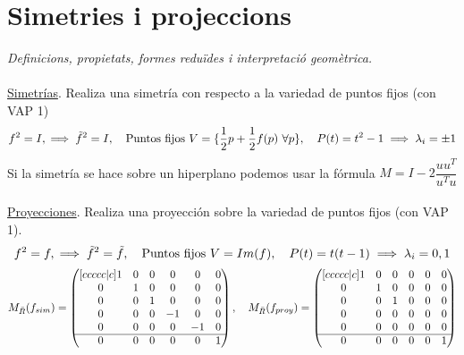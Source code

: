 \documentclass{article}
\newcommand{\h}{\hspace{1em}}
\renewcommand{\t}[1]{\text{#1}}
\begin{document}
\section{Simetries i projeccions} 
\textit{Definicions, propietats, formes reduïdes i interpretació
geomètrica.} \\
\\
\underline{Simetrías}. Realiza una simetría con respecto a la variedad de puntos fijos (con VAP 1)\\
\[f^2 = I, \implies \Tilde{f}^2 = I, \h \t{Puntos fijos } V = \{\frac{1}{2}p + \frac{1}{2} f(p) \ \forall p\}, \h P(t)= t^2-1 \implies \lambda_i = \pm 1\]
Si la simetría se hace sobre un hiperplano podemos usar la fórmula $M = I - 2\dfrac{uu^T}{u^Tu}$ \\
\\
\underline{Proyecciones}. Realiza una proyección sobre la variedad de puntos fijos (con VAP 1).
\[f^2 = f, \implies \Tilde{f}^2 = \Tilde{f}, \h \t{Puntos fijos } V = Im(f), \h P(t)= t(t-1) \implies \lambda_i = 0, 1\]
\[M_{\Bar{R}}(f_{sim}) = 
\begin{pmatrix}[ccccc|c]
    1 & 0 & 0 & 0 & 0 & 0 \\
    0 & 1 & 0 & 0 & 0 & 0 \\
    0 & 0 & 1 & 0 & 0 & 0 \\
    0 & 0 & 0 & -1 & 0 & 0 \\
    0 & 0 & 0 & 0 & -1 & 0 \\
    \hline
    0 & 0 & 0 & 0 & 0 & 1 \\
\end{pmatrix}, \h 
M_{\Bar{R}}(f_{proy}) = 
\begin{pmatrix}[ccccc|c]
    1 & 0 & 0 & 0 & 0 & 0 \\
    0 & 1 & 0 & 0 & 0 & 0 \\
    0 & 0 & 1 & 0 & 0 & 0 \\
    0 & 0 & 0 & 0 & 0 & 0 \\
    0 & 0 & 0 & 0 & 0 & 0 \\
    \hline
    0 & 0 & 0 & 0 & 0 & 1 \\
\end{pmatrix}\]
\end{document}

